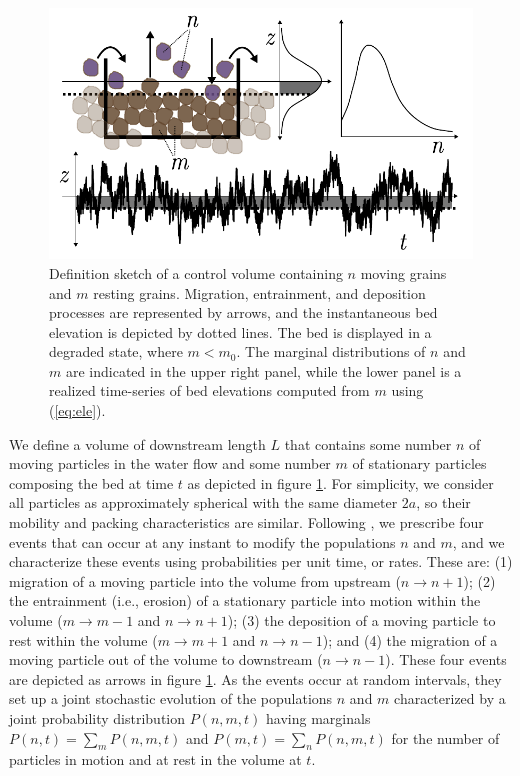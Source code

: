 \documentclass[draft]{agujournal2018}
\begin{document}
\begin{figure}
	\includegraphics[width=\linewidth,keepaspectratio]{../figures/definition-combo.pdf}
	\vspace{-1.0cm}
	\caption{Definition sketch of a control volume containing $n$ moving grains and $m$ resting grains. Migration, entrainment, and deposition processes are represented by arrows, and the instantaneous bed elevation is depicted by dotted lines. The bed is displayed in a degraded state, where $m<m_0$. The marginal distributions of $n$ and $m$ are indicated in the upper right panel, while the lower panel is a realized time-series of bed elevations computed from $m$ using (\ref{eq:ele}).}
	\label{fig:concept}
	\vspace{-0.75cm}
\end{figure}

We define a volume of downstream length $L$ that contains some number $n$ of moving particles in the water flow and some number $m$ of stationary particles composing the bed at time $t$ as depicted in figure \ref{fig:concept}.
For simplicity, we consider all particles as approximately spherical with the same diameter $2a$, so their mobility and packing characteristics are similar.
Following \citet{Ancey2008}, we prescribe four events that can occur at any instant to modify the populations $n$ and $m$, and we characterize these events using probabilities per unit time, or rates.
These are: (1) migration of a moving particle into the volume from upstream ($n \rightarrow n+1$); (2) the entrainment (i.e., erosion) of a stationary particle into motion within the volume ($m\rightarrow m-1$ and $n\rightarrow n+1$); (3) the deposition of a moving particle to rest within the volume ($m\rightarrow m+1$ and $n\rightarrow n-1$); and (4) the migration of a moving particle out of the volume to downstream ($n\rightarrow n-1$).
These four events are depicted as arrows in figure \ref{fig:concept}.
As the events occur at random intervals, they set up a joint stochastic evolution of the populations $n$ and $m$ characterized by a joint probability distribution $P(n,m,t)$ having marginals $P(n,t) = \sum_m P(n,m,t)$ and $P(m,t) = \sum_n P(n,m,t)$ for the number of particles in motion and at rest in the volume at $t$.
\end{document}
